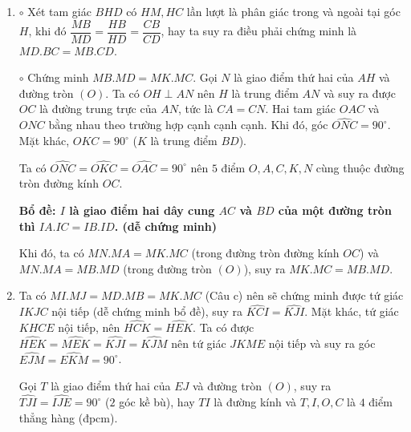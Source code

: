 \begin{ex}
{\begin{enumerate}
	Xét hai tam giác $OHB$ và $OBC$. Ta có
	$\heva{&\widehat{BOH}=\widehat{COB}\\&\dfrac{OH}{OB}=\dfrac{OB}{OC},}$ nên hai tam giác $OHB$ và $OBC$
	 đồng dạng với nhau (trường hợp c.g.c).
	 
	 Từ đó suy ra $\widehat{OHB}=\widehat{OBC}$. Mà $\widehat{OBC}=90^{\circ}-\widehat{ACD}=90^{\circ}-\widehat{DHM}$ (tứ giác $AHDC$ nội tiếp). Bên cạnh đó,     $\widehat{OHB}=90^{\circ}-\widehat{BHM}$. Suy ra, góc $\widehat{BHM}=\widehat{DHM}$, $ HM $ là tia phân giác của góc $BHD$.        
	\item 	 $\circ$
	Xét tam giác $BHD$ có $HM,HC$ lần lượt là phân giác trong và ngoài tại góc $H$, khi đó $\dfrac{MB}{MD}=\dfrac{HB}{HD}=\dfrac{CB}{CD}$, hay ta suy ra điều phải chứng minh là $MD.BC=MB.CD$.
	
	 $\circ$ Chứng minh $MB.MD=MK.MC$. Gọi $N$ là giao điểm thứ hai của $AH$ và đường tròn $(O)$. Ta có $OH\perp AN$ nên $H$ là trung điểm $AN$ và suy ra được $OC$ là đường trung trực của $AN$, tức là $CA=CN$. Hai tam giác $OAC$ và $ONC$ bằng nhau theo trường hợp cạnh cạnh cạnh. Khi đó, góc $\widehat{ONC}=90^{\circ}$. Mặt khác, $\widehat{OKC}=90^{\circ}$ ($ K $ là trung điểm $BD$).
	 
	 Ta có $\widehat{ONC}=\widehat{OKC}=\widehat{OAC}=90^{\circ}$ nên $5$ điểm $O,A,C,K,N$ cùng thuộc đường tròn đường kính $OC$.
	 
\textbf{Bổ đề: $I$ là giao điểm hai dây cung $AC$ và $BD$ của một đường tròn thì $IA.IC=IB.ID$. (dễ chứng minh)}
	 
	 Khi đó, ta có $MN.MA=MK.MC$ (trong đường tròn đường kính $ OC $) và $MN.MA=MB.MD$ (trong đường tròn $ (O) $), suy ra $MK.MC=MB.MD$.
	 
	\item Ta có $MI.MJ=MD.MB=MK.MC$ (Câu c) nên sẽ chứng minh được tứ giác $IKJC$ nội tiếp (dễ chứng minh bổ đề), suy ra $\widehat{KCI}=\widehat{KJI}$. Mặt khác, tứ giác $KHCE$ nội tiếp, nên $\widehat{HCK}=\widehat{HEK}$. Ta có được $\widehat{HEK}=\widehat{MEK}=\widehat{KJI}=\widehat{KJM}$ nên tứ giác $JKME$ nội tiếp và suy ra góc $\widehat{EJM}=\widehat{EKM}=90^{\circ}$.
	
	Gọi $T$ là giao điểm thứ hai của $EJ$ và đường tròn $(O)$, suy ra $\widehat{TJI}=\widehat{IJE}=90^{\circ}$ ($ 2 $ góc kề bù), hay $TI$ là đường kính và $T,I,O,C$ là $4$ điểm thẳng hàng (đpcm).
\end{enumerate}
}
\end{ex}
